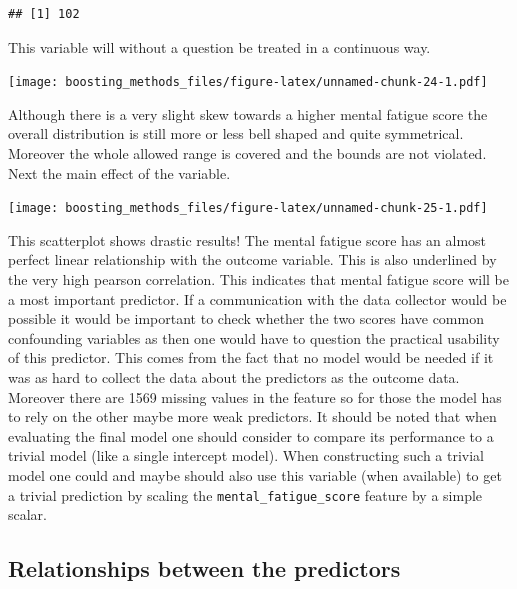 \documentclass[
]{book}
\newenvironment{Shaded}{\begin{snugshade}}{\end{snugshade}}
\newcommand{\CommentTok}[1]{\textcolor[rgb]{0.56,0.35,0.01}{\textit{#1}}}
\newcommand{\FunctionTok}[1]{\textcolor[rgb]{0.00,0.00,0.00}{#1}}
\newcommand{\NormalTok}[1]{#1}
\newcommand{\SpecialCharTok}[1]{\textcolor[rgb]{0.00,0.00,0.00}{#1}}
\begin{document}
\begin{Shaded}
\end{Shaded}

\begin{verbatim}
## [1] 102
\end{verbatim}

This variable will without a question be treated in a continuous way.

\texttt{[image: boosting\_methods\_files/figure-latex/unnamed-chunk-24-1.pdf]}

Although there is a very slight skew towards a higher mental fatigue score the overall distribution is still more or less bell shaped and quite symmetrical. Moreover the whole allowed range is covered and the bounds are not violated. Next the main effect of the variable.

\texttt{[image: boosting\_methods\_files/figure-latex/unnamed-chunk-25-1.pdf]}

This scatterplot shows drastic results! The mental fatigue score has an almost perfect linear relationship with the outcome variable. This is also underlined by the very high pearson correlation. This indicates that mental fatigue score will be a most important predictor. If a communication with the data collector would be possible it would be important to check whether the two scores have common confounding variables as then one would have to question the practical usability of this predictor. This comes from the fact that no model would be needed if it was as hard to collect the data about the predictors as the outcome data. Moreover there are 1569 missing values in the feature so for those the model has to rely on the other maybe more weak predictors. It should be noted that when evaluating the final model one should consider to compare its performance to a trivial model (like a single intercept model). When constructing such a trivial model one could and maybe should also use this variable (when available) to get a trivial prediction by scaling the \texttt{mental\_fatigue\_score} feature by a simple scalar.

\hypertarget{relationships-between-the-predictors}{%
\subsection{Relationships between the predictors}\label{relationships-between-the-predictors}}
\end{document}
